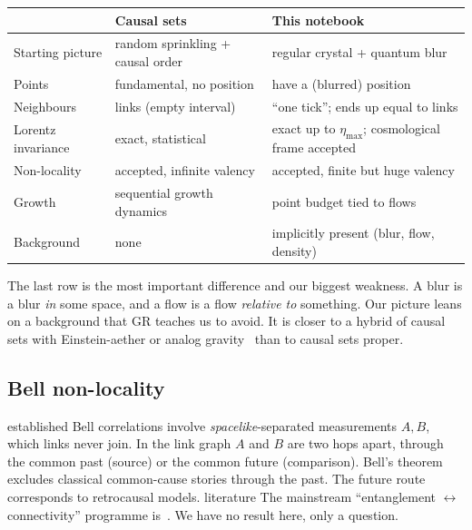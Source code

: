 \documentclass[11pt,a4paper]{article}
\newcommand{\tagbox}[2]{\textsf{\scriptsize\colorbox{#1!12}{\textcolor{#1!70!black}{#2}}}}
\newcommand{\est}{\tagbox{gray}{established}}
\newcommand{\lit}{\tagbox{blue}{literature}}
\begin{document}
\begin{center}
\small
\begin{tabular}{@{}>{\raggedright\arraybackslash}p{3.0cm}>{\raggedright\arraybackslash}p{5.3cm}>{\raggedright\arraybackslash}p{5.7cm}@{}}
\toprule
 & Causal sets & This notebook \\
\midrule
Starting picture & random sprinkling + causal order & regular crystal + quantum blur \\
Points & fundamental, no position & have a (blurred) position \\
Neighbours & links (empty interval) & ``one tick''; ends up equal to links \\
Lorentz invariance & exact, statistical & exact up to $\eta_{\max}$; cosmological frame accepted \\
Non-locality & accepted, infinite valency & accepted, finite but huge valency \\
Growth & sequential growth dynamics & point budget tied to flows \\
Background & none & implicitly present (blur, flow, density) \\
\bottomrule
\end{tabular}
\end{center}

\noindent The last row is the most important difference and our biggest weakness. A blur is a blur \emph{in} some space, and a flow is a flow \emph{relative to} something. Our picture leans on a background that GR teaches us to avoid. It is closer to a hybrid of causal sets with Einstein-aether or analog gravity~\cite{Unruh81} than to causal sets proper.

\subsection{Bell non-locality}
\est{} Bell correlations involve \emph{spacelike}-separated measurements $A,B$, which links never join. In the link graph $A$ and $B$ are two hops apart, through the common past (source) or the common future (comparison). Bell's theorem excludes classical common-cause stories through the past. The future route corresponds to retrocausal models. \lit{} The mainstream ``entanglement $\leftrightarrow$ connectivity'' programme is~\cite{VanRaamsdonk10,MaldacenaSusskind13}. We have no result here, only a question.
\end{document}
